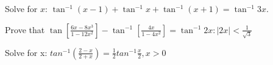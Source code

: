 
\item Solve for $x$: $\tan^{-1}(x-1) + \tan^{-1}x + \tan^{-1}(x+1) = \tan^{-1}3x$.
\hfill{}\item Prove that $\tan[\frac{6x-8x^3}{1-12x^2}]-\tan^{-1}[\frac{4x}{1-4x^2}]=\tan^{-1}2x:|2x|<\frac{1}{\sqrt{3}}$
\hfill{}\item Solve for x: $tan^{-1}(\frac{2-x}{2+x}) = \frac{1}{2} tan^{-1}\frac{x}{2},x>0$
\hfill{}
